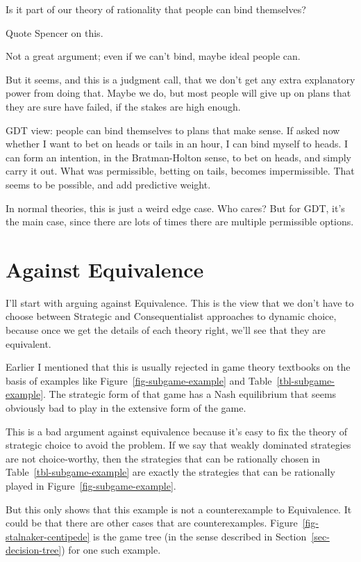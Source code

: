 \documentclass[
  12pt,
  letterpaper,
  DIV=11,
  numbers=noendperiod]{scrreprt}
\begin{document}
Is it part of our theory of rationality that people can bind themselves?

Quote Spencer on this.

Not a great argument; even if we can't bind, maybe ideal people can.

But it seems, and this is a judgment call, that we don't get any extra
explanatory power from doing that. Maybe we do, but most people will
give up on plans that they are sure have failed, if the stakes are high
enough.

GDT view: people can bind themselves to plans that make sense. If asked
now whether I want to bet on heads or tails in an hour, I can bind
myself to heads. I can form an intention, in the Bratman-Holton sense,
to bet on heads, and simply carry it out. What was permissible, betting
on tails, becomes impermissible. That seems to be possible, and add
predictive weight.

In normal theories, this is just a weird edge case. Who cares? But for
GDT, it's the main case, since there are lots of times there are
multiple permissible options.

\section{Against Equivalence}\label{sec-against-equivalence}

I'll start with arguing against Equivalence. This is the view that we
don't have to choose between Strategic and Consequentialist approaches
to dynamic choice, because once we get the details of each theory right,
we'll see that they are equivalent.

Earlier I mentioned that this is usually rejected in game theory
textbooks on the basis of examples like Figure~\ref{fig-subgame-example}
and Table~\ref{tbl-subgame-example}. The strategic form of that game has
a Nash equilibrium that seems obviously bad to play in the extensive
form of the game.

This is a bad argument against equivalence because it's easy to fix the
theory of strategic choice to avoid the problem. If we say that weakly
dominated strategies are not choice-worthy, then the strategies that can
be rationally chosen in Table~\ref{tbl-subgame-example} are exactly the
strategies that can be rationally played in
Figure~\ref{fig-subgame-example}.

But this only shows that this example is not a counterexample to
Equivalence. It could be that there are other cases that are
counterexamples. Figure~\ref{fig-stalnaker-centipede} is the game tree
(in the sense described in Section~\ref{sec-decision-tree}) for one such
example.
\end{document}
